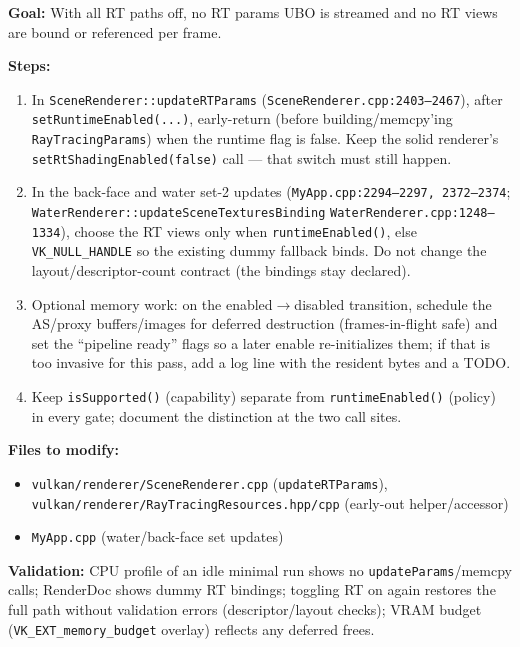 \documentclass[11pt,a4paper]{article}
\begin{document}
\begin{tcolorbox}[promptbox={Prompt: Suppress Per-Frame RT Work While the RT Runtime Is Disabled}]
\textbf{Goal:} With all RT paths off, no RT params UBO is streamed and no RT views are bound or referenced per frame.

\textbf{Steps:}
\begin{enumerate}
    \item In \texttt{SceneRenderer::updateRTParams} (\texttt{SceneRenderer.cpp:2403--2467}), after \texttt{setRuntimeEnabled(...)}, early-return (before building/memcpy'ing
    \texttt{RayTracingParams}) when the runtime flag is false. Keep the solid renderer's \texttt{setRtShadingEnabled(false)} call --- that switch must still happen.
    \item In the back-face and water set-2 updates (\texttt{MyApp.cpp:2294--2297, 2372--2374}; \texttt{WaterRenderer::updateSceneTexturesBinding}
    \texttt{WaterRenderer.cpp:1248--1334}), choose the RT views only when \texttt{runtimeEnabled()}, else \texttt{VK\_NULL\_HANDLE} so the existing dummy fallback binds. Do not
    change the layout/descriptor-count contract (the bindings stay declared).
    \item Optional memory work: on the enabled$\to$disabled transition, schedule the AS/proxy buffers/images for deferred destruction (frames-in-flight safe) and set the
    ``pipeline ready'' flags so a later enable re-initializes them; if that is too invasive for this pass, add a log line with the resident bytes and a TODO.
    \item Keep \texttt{isSupported()} (capability) separate from \texttt{runtimeEnabled()} (policy) in every gate; document the distinction at the two call sites.
\end{enumerate}

\textbf{Files to modify:}
\begin{itemize}
    \item \texttt{vulkan/renderer/SceneRenderer.cpp} (\texttt{updateRTParams}), \texttt{vulkan/renderer/RayTracingResources.hpp/cpp} (early-out helper/accessor)
    \item \texttt{MyApp.cpp} (water/back-face set updates)
\end{itemize}

\textbf{Validation:} CPU profile of an idle minimal run shows no \texttt{updateParams}/memcpy calls; RenderDoc shows dummy RT bindings; toggling RT on again restores the
full path without validation errors (descriptor/layout checks); VRAM budget (\texttt{VK\_EXT\_memory\_budget} overlay) reflects any deferred frees.
\end{tcolorbox}
\end{document}
